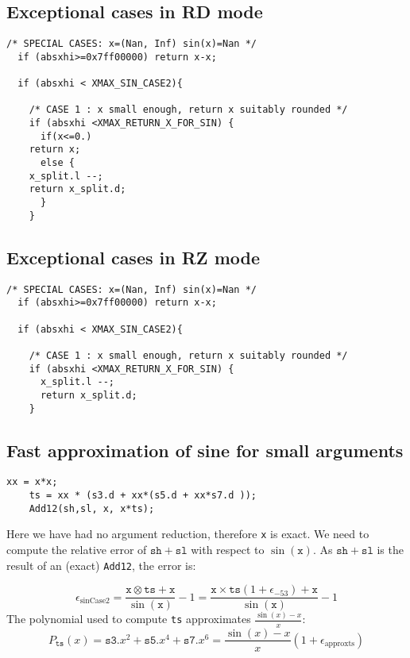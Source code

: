 \subsection{Exceptional cases in RD mode}
\begin{lstlisting}[caption={Exceptional cases for sine RD},firstnumber=1]
  /* SPECIAL CASES: x=(Nan, Inf) sin(x)=Nan */
  if (absxhi>=0x7ff00000) return x-x;    
  
  if (absxhi < XMAX_SIN_CASE2){

    /* CASE 1 : x small enough, return x suitably rounded */
    if (absxhi <XMAX_RETURN_X_FOR_SIN) {
      if(x<=0.)
	return x;
      else {
	x_split.l --;
	return x_split.d;
      }
    }
\end{lstlisting}
\subsection{Exceptional cases in RZ mode}
\begin{lstlisting}[caption={Exceptional cases for sine RZ},firstnumber=1]
  /* SPECIAL CASES: x=(Nan, Inf) sin(x)=Nan */
  if (absxhi>=0x7ff00000) return x-x;    
  
  if (absxhi < XMAX_SIN_CASE2){

    /* CASE 1 : x small enough, return x suitably rounded */
    if (absxhi <XMAX_RETURN_X_FOR_SIN) {
      x_split.l --;
      return x_split.d;
    }
\end{lstlisting}


\subsection{Fast approximation of sine for small arguments \label{sec:trigo:fastsine}}

\begin{lstlisting}[caption={Sine, case 2},firstnumber=1]
    xx = x*x;
    ts = xx * (s3.d + xx*(s5.d + xx*s7.d ));
    Add12(sh,sl, x, x*ts);
\end{lstlisting}

Here we have had no argument reduction, therefore \texttt{x} is exact.
We need to compute the relative error of $\mathtt{sh}+\mathtt{sl}$
with respect to $\sin(\mathtt{x})$. As $\mathtt{sh}+\mathtt{sl}$ is
the result of an (exact) \texttt{Add12}, the error is:

\begin{equation}
  \epsilon_{\mathrm{sinCase2}} = \frac{\mathtt{x}\otimes \mathtt{ts} + \mathtt{x}}{\sin(\mathtt{x})} -1 = \frac{\mathtt{x}\times\mathtt{ts}(1+\epsilon_{-53}) + \mathtt{x}}{\sin(\mathtt{x})} -1
\label{eq:SinCase2Total}
\end{equation}
The polynomial used to compute \texttt{ts}
approximates $\frac{\sin(x)-x}{x}$: 
$$
P_{\mathtt{ts}}(x) = \mathtt{s3}.x^2 + \mathtt{s5}.x^4 + \mathtt{s7}.x^6
= \frac{\sin(x)-x}{x}(1+\epsilon_{\mathrm{approxts}})
$$

